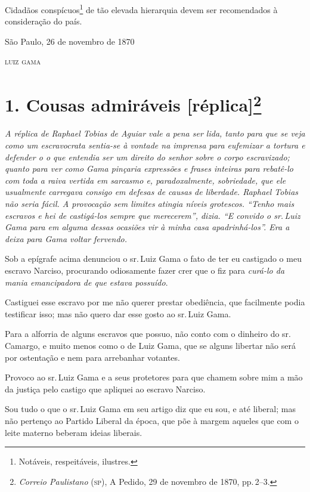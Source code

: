 Cidadãos conspícuos\footnote{ Notáveis, respeitáveis, ilustres.} de
tão elevada hierarquia devem ser recomendados à consideração do país.

\begin{flushright}
São Paulo, 26 de novembro de 1870

\textsc{luiz gama}
\end{flushright}

\chapter{1. Cousas admiráveis {[}réplica{]}\footnote{\emph{Correio Paulistano} (\textsc{sp}), A Pedido, 29 de novembro de 1870,
  pp.\,2--3.}} %

\begin{didascalia}
\emph{A réplica de Raphael Tobias de Aguiar vale a pena ser lida, tanto
para que se veja como um escravocrata sentia-se à vontade na imprensa
para eufemizar a tortura e defender o o que entendia ser um direito do
senhor sobre o corpo escravizado; quanto para ver como Gama pinçaria
expressões e frases inteiras para rebatê-lo com toda a raiva vertida em
sarcasmo e, paradoxalmente, sobriedade, que ele usualmente carregava
consigo em defesas de causas de liberdade. Raphael Tobias não seria
fácil. A provocação sem limites atingia níveis grotescos. ``Tenho mais
escravos e hei de castigá-los sempre que merecerem'', dizia. ``E convido o
sr.\,Luiz Gama para em alguma dessas ocasiões vir à minha casa
apadrinhá-los''. Era a deixa para Gama voltar fervendo.}
\end{didascalia}


Sob a epígrafe acima denunciou o sr.\,Luiz Gama o fato de ter eu
castigado o meu escravo Narciso, procurando odiosamente fazer crer que o
fiz para \emph{curá-lo da mania emancipadora de que estava possuído}.

Castiguei esse escravo por me não querer prestar obediência, que
facilmente podia testificar isso; mas não quero dar esse gosto ao sr.\,Luiz Gama.

Para a alforria de alguns escravos que possuo, não conto com o dinheiro
do sr.\,Camargo, e muito menos como o de Luiz Gama, que se alguns
libertar não será por ostentação e nem para arrebanhar votantes.

Provoco ao sr.\,Luiz Gama e a seus protetores para que chamem sobre mim a
mão da justiça pelo castigo que apliquei ao escravo Narciso.

Sou tudo o que o sr.\,Luiz Gama em seu artigo diz que eu sou, e até
liberal; mas não pertenço ao Partido Liberal da época, que põe à margem
aqueles que com o leite materno beberam ideias liberais.

